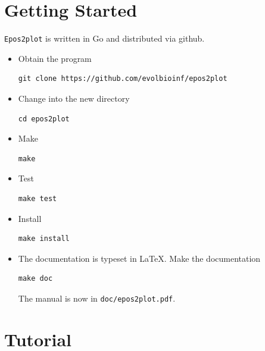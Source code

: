 \documentclass[a4paper]{article}
\newcommand{\ty}{\texttt}
\begin{document}
\section{Getting Started}
\ty{Epos2plot} is written in Go and distributed via github.
\begin{itemize}
\item Obtain the program
\begin{verbatim}
git clone https://github.com/evolbioinf/epos2plot
\end{verbatim}
\item Change into the new directory
\begin{verbatim}
cd epos2plot
\end{verbatim}
\item Make
\begin{verbatim}
make
\end{verbatim}
\item Test
\begin{verbatim}
make test
\end{verbatim}
\item Install
\begin{verbatim}
make install
\end{verbatim}
\item The documentation is typeset in \LaTeX{}. Make the documentation
\begin{verbatim}
make doc
\end{verbatim}
The manual is now in \ty{doc/epos2plot.pdf}.
\end{itemize}

\section{Tutorial}
\end{document}
